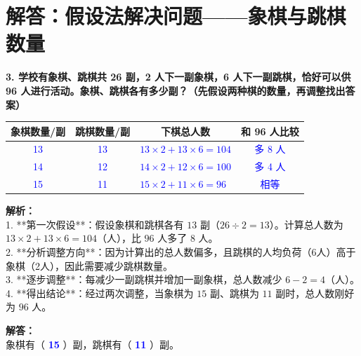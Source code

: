 \newpage



\section{解答：假设法解决问题——象棋与跳棋数量}

\vspace{0.4cm}

\noindent\textbf{3. 学校有象棋、跳棋共 26 副，2 人下一副象棋，6 人下一副跳棋，恰好可以供 96 人进行活动。象棋、跳棋各有多少副？（先假设两种棋的数量，再调整找出答案）}

\vspace{0.8cm}

\begin{center}
\renewcommand{\arraystretch}{1.8}
\begin{tabular}{|c|c|l|c|}
\hline
\textbf{象棋数量/副} & \textbf{跳棋数量/副} & \multicolumn{1}{c|}{\textbf{下棋总人数}} & \textbf{和 96 人比较} \\ \hline
\textcolor{blue}{13} & \textcolor{blue}{13} & \textcolor{blue}{$13 \times 2 + 13 \times 6 = 104$} & \textcolor{blue}{多 8 人} \\ \hline
\textcolor{blue}{14} & \textcolor{blue}{12} & \textcolor{blue}{$14 \times 2 + 12 \times 6 = 100$} & \textcolor{blue}{多 4 人} \\ \hline
\textcolor{blue}{15} & \textcolor{blue}{11} & \textcolor{blue}{$15 \times 2 + 11 \times 6 = 96$} & \textcolor{blue}{相等} \\ \hline
\end{tabular}
\end{center}

\vspace{0.6cm}

{\small\color{gray}
\textbf{解析：}\\
1. **第一次假设**：假设象棋和跳棋各有 $13$ 副（$26 \div 2 = 13$）。计算总人数为 $13 \times 2 + 13 \times 6 = 104$（人），比 $96$ 人多了 $8$ 人。\\
2. **分析调整方向**：因为计算出的总人数偏多，且跳棋的人均负荷（6人）高于象棋（2人），因此需要减少跳棋数量。\\
3. **逐步调整**：每减少一副跳棋并增加一副象棋，总人数减少 $6 - 2 = 4$（人）。\\
4. **得出结论**：经过两次调整，当象棋为 $15$ 副、跳棋为 $11$ 副时，总人数刚好为 $96$ 人。
}

\vspace{0.4cm}
\noindent\textbf{解答：}\\
象棋有（ \textbf{\textcolor{blue}{15}} ）副，跳棋有（ \textbf{\textcolor{blue}{11}} ）副。

